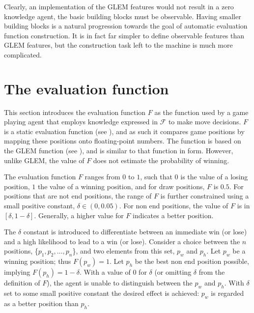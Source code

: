 Clearly, an implementation of the GLEM features would not result in a zero knowledge agent,  the basic building blocks must be observable.   Having smaller building blocks is a natural progression towards the goal of automatic evaluation function construction.  It is in fact far simpler to define observable features than GLEM features, but the construction task left to the machine is much more complicated.  

\section{The evaluation function}
\label{sec:knowledge-function}
This section introduces the evaluation function $F$ as the function used by a game playing agent that employs knowledge expressed in $\mathcal{F}$ to make move decisions. $F$ is a static evaluation function (see ), and as such it compares game positions by mapping these positions onto floating-point numbers.  The function is based on the GLEM function (see ), and is similar to that function in form.  However, unlike GLEM, the value of $F$ does not estimate the probability of winning.

The evaluation function $F$ ranges from $0$ to $1$, such that $0$ is the value of a losing position,  $1$ the value of a winning position, and for draw positions, $F$ is $0.5$.  For positions that are not end positions, the range of $F$ is further constrained using a small positive constant, $\delta \in (0,0.05)$.  
For non end positions, the value of $F$ is in $[\delta,1-\delta]$. Generally, a higher value for $F$ indicates a better position.

The $\delta$ constant is introduced to differentiate between an immediate win (or lose) and a high likelihood to lead to a win (or lose). Consider a choice between the  $n$ positions, \{$p_1,p_2,\ldots,p_n$\}, and two elements from this set, $p_w$ and $p_h$. Let  $p_w$ be a winning position; thus  $F(p_w) = 1$. Let $p_h$ be the best non end position possible, implying $F(p_h) = 1 - \delta$.  With a value of $0$  for $\delta$ (or omitting $\delta$ from the definition of $F$), the agent is unable to distinguish between the $p_w$ and $p_h$.  With $\delta$ set to some small positive constant the desired effect is achieved:  $p_w$ is regarded as a better position than $p_h$.

